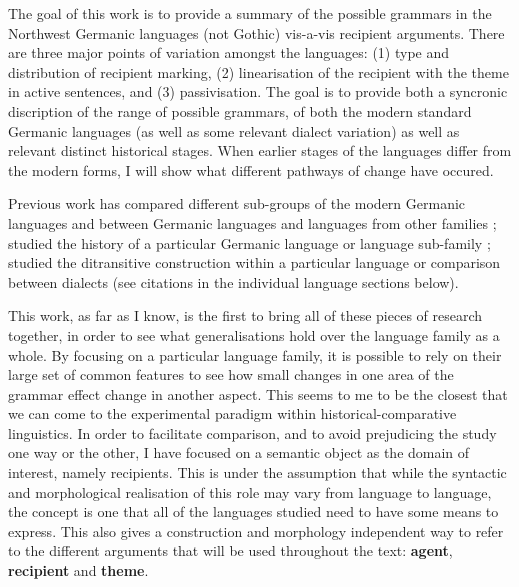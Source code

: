 The goal of this work is to provide a summary of the possible grammars in the Northwest Germanic languages (not Gothic) vis-a-vis recipient arguments. There are three major points of variation amongst the languages: (1) type and distribution of recipient marking, (2) linearisation of the recipient with the theme in active sentences, and (3) passivisation. The goal is to provide both a syncronic discription of the range of possible grammars, of both the modern standard Germanic languages (as well as some relevant dialect variation) as well as relevant distinct historical stages. When earlier stages of the languages differ from the modern forms, I will show what different pathways of change have occured. 

Previous work has compared different sub-groups of the modern Germanic languages and between Germanic languages and languages from other families \citep[and others]{Falk.1990, Holmberg.1995, Sprouse.1995, Weerman.1997, Holmberg.1998, Primus.1998, Anagnostopoulou.2003, McFadden.2004, Platzack.2005, Bardal.2006, Heine.2010, Alexiadou.2013, Johannessen.2013, Haddican.2014}; studied the history of a particular Germanic language or language sub-family \citep[and others]{Burridge.1993, Kristoffersen.1994, Kiparsky.1997, Allen.1999, Bardal.2001b, McFadden.2002, Hoskuldurrainsson.2004, Sigursson.2012}; studied the ditransitive construction within a particular language or comparison between dialects (see citations in the individual language sections below). 

This work, as far as I know, is the first to bring all of these pieces of research together, in order to see what generalisations hold over the language family as a whole. By focusing on a particular language family, it is possible to rely on their large set of common features to see how small changes in one area of the grammar effect change in another aspect. This seems to me to be the closest that we can come to the experimental paradigm within historical-comparative linguistics. In order to facilitate comparison, and to avoid prejudicing the study one way or the other, I have focused on a semantic object as the domain of interest, namely recipients. This is under the assumption that while the syntactic and morphological realisation of this role may vary from language to language, the concept is one that all of the languages studied need to have some means to express.  This also gives a construction and morphology independent way to refer to the different arguments that will be used throughout the text: \textbf{agent}, \textbf{recipient} and \textbf{theme}.

